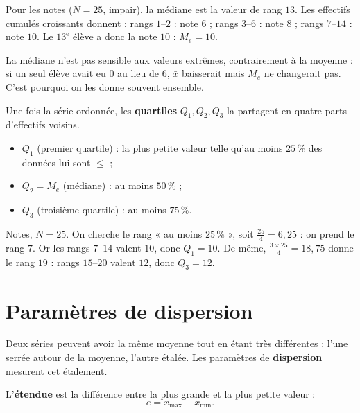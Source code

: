 \begin{exemple}
Pour les notes ($N=25$, impair), la médiane est la valeur de rang $13$. Les effectifs
cumulés croissants donnent : rangs $1$–$2$ : note $6$ ; rangs $3$–$6$ : note $8$ ;
rangs $7$–$14$ : note $10$. Le $13^{\text{e}}$ élève a donc la note $10$ :
$M_e = 10$.
\end{exemple}

\begin{remarque}
La médiane n'est pas sensible aux valeurs extrêmes, contrairement à la moyenne :
si un seul élève avait eu $0$ au lieu de $6$, $\bar x$ baisserait mais $M_e$ ne
changerait pas. C'est pourquoi on les donne souvent ensemble.
\end{remarque}

\begin{definition}[Quartiles]
Une fois la série ordonnée, les \textbf{quartiles} $Q_1,Q_2,Q_3$ la partagent en
quatre parts d'effectifs voisins.
\begin{itemize}
  \item $Q_1$ (premier quartile) : la plus petite valeur telle qu'au moins $25\,\%$
        des données lui sont $\le$ ;
  \item $Q_2 = M_e$ (médiane) : au moins $50\,\%$ ;
  \item $Q_3$ (troisième quartile) : au moins $75\,\%$.
\end{itemize}
\end{definition}

\begin{exemple}
Notes, $N=25$. On cherche le rang « au moins $25\,\%$ », soit $\frac{25}{4}=6{,}25$ :
on prend le rang $7$. Or les rangs $7$–$14$ valent $10$, donc $Q_1=10$. De même,
$\frac{3\times25}{4}=18{,}75$ donne le rang $19$ : rangs $15$–$20$ valent $12$, donc
$Q_3=12$.
\end{exemple}

\section{Paramètres de dispersion}

Deux séries peuvent avoir la même moyenne tout en étant très différentes : l'une
serrée autour de la moyenne, l'autre étalée. Les paramètres de \textbf{dispersion}
mesurent cet étalement.

\begin{definition}[Étendue]
L'\textbf{étendue} est la différence entre la plus grande et la plus petite valeur :
\[ e = x_{\max} - x_{\min}. \]
\end{definition}

